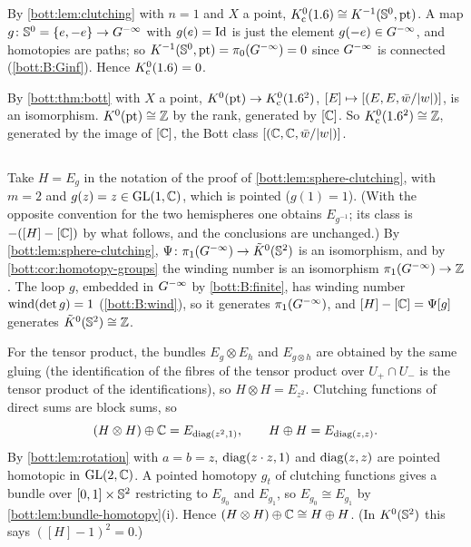 \subsection*{}
By \cref{bott:lem:clutching} with $n=1$ and $X$ a point,
$K_{\mathrm{c}}^0(1.6)\cong K^{-1}(\mathbb{S}^0,\mathrm{pt})$. A map $g\colon\mathbb{S}^0=\{e,-e\}\to G^{-\infty}$
with $g(e)=\operatorname{Id}$ is just the element $g(-e)\in G^{-\infty}$, and homotopies are paths; so
$K^{-1}(\mathbb{S}^0,\mathrm{pt})=\pi_0(G^{-\infty})=0$ since $G^{-\infty}$ is connected
(\ref{bott:B:Ginf}). Hence $K_{\mathrm{c}}^0(1.6)=0$.

By \cref{bott:thm:bott} with $X$ a point, $K^0(\mathrm{pt})\to K_{\mathrm{c}}^0(1.6^2)$, $[E]\mapsto
[(E,E,\bar w/\lvert w\rvert)]$, is an isomorphism. $K^0(\mathrm{pt})\cong\mathbb{Z}$ by the rank, generated by
$[\mathbb{C}]$. So $K_{\mathrm{c}}^0(1.6^2)\cong\mathbb{Z}$, generated by the image of $[\mathbb{C}]$, the Bott class
$[(\mathbb{C},\mathbb{C},\bar w/\lvert w\rvert)]$.

\subsection*{}
Take $H=E_g$ in the notation of the proof of \cref{bott:lem:sphere-clutching}, with $m=2$ and
$g(z)=z\in\operatorname{GL}(1,\mathbb{C})$, which is pointed ($g(1)=1$). (With the opposite convention for the two
hemispheres one obtains $E_{g^{-1}}$; its class is $-([H]-[\mathbb{C}])$ by what follows, and the
conclusions are unchanged.) By \cref{bott:lem:sphere-clutching},
$\Psi\colon\pi_1(G^{-\infty})\to\tilde K^0(\mathbb{S}^2)$ is an isomorphism, and by
\cref{bott:cor:homotopy-groups} the winding number is an isomorphism $\pi_1(G^{-\infty})\to\mathbb{Z}$. The
loop $g$, embedded in $G^{-\infty}$ by \ref{bott:B:finite}, has winding number $\operatorname{wind}(\det g)=1$
(\ref{bott:B:wind}), so it generates $\pi_1(G^{-\infty})$, and $[H]-[\mathbb{C}]=\Psi[g]$ generates
$\tilde K^0(\mathbb{S}^2)\cong\mathbb{Z}$.

For the tensor product, the bundles $E_g\otimes E_h$ and $E_{g\otimes h}$ are obtained by the
same gluing (the identification of the fibres of the tensor product over $U_+\cap U_-$ is the
tensor product of the identifications), so $H\otimes H=E_{z^2}$. Clutching functions of direct
sums are block sums, so
\begin{equation*}
  (H\otimes H)\oplus\mathbb{C}=E_{\operatorname{diag}(z^2,1)},\qquad H\oplus H=E_{\operatorname{diag}(z,z)}.
\end{equation*}
By \cref{bott:lem:rotation} with $a=b=z$, $\operatorname{diag}(z\cdot z,1)$ and $\operatorname{diag}(z,z)$ are pointed
homotopic in $\operatorname{GL}(2,\mathbb{C})$. A pointed homotopy $g_t$ of clutching functions gives a bundle over
$[0,1]\times\mathbb{S}^2$ restricting to $E_{g_0}$ and $E_{g_1}$, so $E_{g_0}\cong E_{g_1}$ by
\cref{bott:lem:bundle-homotopy}(i). Hence $(H\otimes H)\oplus\mathbb{C}\cong H\oplus H$. (In
$K^0(\mathbb{S}^2)$ this says $([H]-1)^2=0$.)

